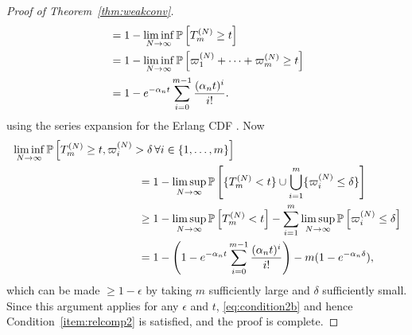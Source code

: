\begin{proof}[Proof of Theorem~\ref{thm:weakconv}]
\begin{align*}
&= 1- \liminf_{N\to\infty} \mathbb{P}\left[ T_m^{(N)} \geq t \right] \\
&= 1- \liminf_{N\to\infty} \mathbb{P}\left[ \varpi_1^{(N)} + \cdots + \varpi_m^{(N)} \geq t \right] \\
&= 1- e^{-\alpha_n t} \sum_{i=0}^{m-1} \frac{(\alpha_n t)^i}{i!} .
\end{align*}
using the series expansion for the Erlang CDF \parencite[see for example][Chapter 15]{forbes2011}.
Now
\begin{align*}
&\liminf_{N\to\infty} 
        \Prob\left[ T_m^{(N)} \geq t, \varpi_i^{(N)} > \delta 
        \,\forall i\in \{1,\dots,m\} \right] \\
&\hspace{4cm}= 1 - \limsup_{N\to\infty} \Prob\left[ \{ T_m^{(N)} < t \} \cup
        \bigcup_{i=1}^m \{ \varpi_i^{(N)} \leq \delta \}  \right]\\
&\hspace{4cm}\geq 1 - \limsup_{N\to\infty} \Prob\left[ T_m^{(N)} < t \right] 
        - \sum_{i=1}^m \limsup_{N\to\infty} \Prob\left[ \varpi_i^{(N)} \leq \delta\right]\\
&\hspace{4cm}= 1- \left( 1- e^{-\alpha_n t} \sum_{i=0}^{m-1} 
        \frac{(\alpha_n t)^i}{i!} \right) - m( 1- e^{-\alpha_n \delta} ) ,
\end{align*}
which can be made $\geq 1-\epsilon$ by taking $m$ sufficiently large and $\delta$ sufficiently small.
Since this argument applies for any $\epsilon$ and $t$, \eqref{eq:condition2b} and hence Condition~\ref{item:relcomp2} is satisfied, and the proof is complete.

\end{proof}
